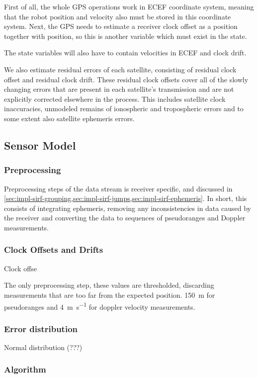 First of all, the whole GPS operations work in ECEF coordinate system, meaning
that the robot position and velocity also must be stored in this coordinate system.
Next, the GPS needs to estimate a receiver clock offset as a position together
with position, so this is another variable which must exist in the state.

The state variables will also have to contain velocities in ECEF and clock drift.

We also estimate residual errors of each satellite,
consisting of residual clock offset and residual clock drift.
These residual clock offsets cover all of the slowly changing errors that are present
in each satellite's transmission and are not explicitly corrected elsewhere in the process.
This includes satellite clock inaccuracies, unmodeled remains of ionospheric and
tropospheric errors and to some extent also satellite ephemeris errors.

\subsection{Sensor Model}

\subsubsection{Preprocessing}
Preprocessing steps of the data stream is receiver specific,
and discussed in \cref{sec:impl-sirf-grouping,sec:impl-sirf-jumps,sec:impl-sirf-ephemeris}.
In short, this consists of integrating ephemeris, removing any inconsistencies in data caused by the
receiver and converting the data to sequences of pseudoranges and Doppler measurements.

\subsubsection{Clock Offsets and Drifts}
Clock offse


The only preprocessing step, these values are thresholded, discarding measurements that are too
far from the expected position.
\SI{150}{\meter} for pseudoranges and \SI{4}{\meter\per\second} for doppler velocity
measurements.


\subsubsection{Error distribution}
Normal distribution (???)

\subsubsection{Algorithm}

